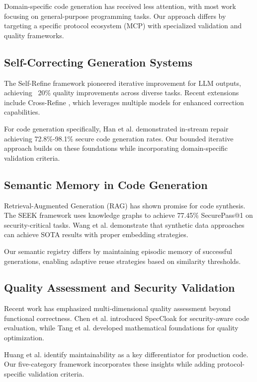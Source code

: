 \documentclass[10pt,twocolumn]{article}
\begin{document}
Domain-specific code generation has received less attention, with most work focusing on general-purpose programming tasks. Our approach differs by targeting a specific protocol ecosystem (MCP) with specialized validation and quality frameworks.

\subsection{Self-Correcting Generation Systems}

The Self-Refine framework \cite{madaan2023self} pioneered iterative improvement for LLM outputs, achieving ~20\% quality improvements across diverse tasks. Recent extensions include Cross-Refine \cite{wang2024cross}, which leverages multiple models for enhanced correction capabilities.

For code generation specifically, Han et al. \cite{han2026security} demonstrated in-stream repair achieving 72.8\%-98.1\% secure code generation rates. Our bounded iterative approach builds on these foundations while incorporating domain-specific validation criteria.

\subsection{Semantic Memory in Code Generation}

Retrieval-Augmented Generation (RAG) has shown promise for code synthesis. The SEEK framework \cite{gadey2026seek} uses knowledge graphs to achieve 77.45\% SecurePass@1 on security-critical tasks. Wang et al. \cite{wang2024synthetic} demonstrate that synthetic data approaches can achieve SOTA results with proper embedding strategies.

Our semantic registry differs by maintaining episodic memory of successful generations, enabling adaptive reuse strategies based on similarity thresholds.

\subsection{Quality Assessment and Security Validation}

Recent work has emphasized multi-dimensional quality assessment beyond functional correctness. Chen et al. \cite{chen2026spec} introduced SpecCloak for security-aware code evaluation, while Tang et al. \cite{tang2026transform} developed mathematical foundations for quality optimization.

Huang et al. \cite{huang2026quality} identify maintainability as a key differentiator for production code. Our five-category framework incorporates these insights while adding protocol-specific validation criteria.
\end{document}
